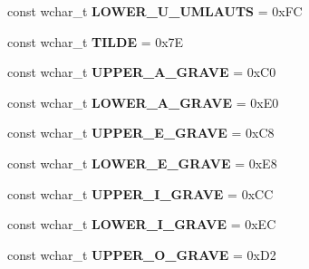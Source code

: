 \begin{DoxyCompactItemize}
\item 
\hypertarget{group___indexing_ga96b79561e32ed393418b5d21ce0f3fad}{const wchar\-\_\-t {\bfseries L\-O\-W\-E\-R\-\_\-\-U\-\_\-\-U\-M\-L\-A\-U\-T\-S} = 0x\-F\-C}\label{group___indexing_ga96b79561e32ed393418b5d21ce0f3fad}

\item 
\hypertarget{group___indexing_ga1602d4f3afaafb87cfc706ae0fc72bce}{const wchar\-\_\-t {\bfseries T\-I\-L\-D\-E} = 0x7\-E}\label{group___indexing_ga1602d4f3afaafb87cfc706ae0fc72bce}

\item 
\hypertarget{group___indexing_ga8c401d2c95f1613f3028c30c9c3dd920}{const wchar\-\_\-t {\bfseries U\-P\-P\-E\-R\-\_\-\-A\-\_\-\-G\-R\-A\-V\-E} = 0x\-C0}\label{group___indexing_ga8c401d2c95f1613f3028c30c9c3dd920}

\item 
\hypertarget{group___indexing_gad683b154d045922a0a5de25e7c837ec4}{const wchar\-\_\-t {\bfseries L\-O\-W\-E\-R\-\_\-\-A\-\_\-\-G\-R\-A\-V\-E} = 0x\-E0}\label{group___indexing_gad683b154d045922a0a5de25e7c837ec4}

\item 
\hypertarget{group___indexing_ga662a573a962fa386fa070e78055c5a67}{const wchar\-\_\-t {\bfseries U\-P\-P\-E\-R\-\_\-\-E\-\_\-\-G\-R\-A\-V\-E} = 0x\-C8}\label{group___indexing_ga662a573a962fa386fa070e78055c5a67}

\item 
\hypertarget{group___indexing_gad06e4b2ecd54bb7e694f66301c641c3c}{const wchar\-\_\-t {\bfseries L\-O\-W\-E\-R\-\_\-\-E\-\_\-\-G\-R\-A\-V\-E} = 0x\-E8}\label{group___indexing_gad06e4b2ecd54bb7e694f66301c641c3c}

\item 
\hypertarget{group___indexing_gabd5696c94be07f8ec253c01e4c5d7298}{const wchar\-\_\-t {\bfseries U\-P\-P\-E\-R\-\_\-\-I\-\_\-\-G\-R\-A\-V\-E} = 0x\-C\-C}\label{group___indexing_gabd5696c94be07f8ec253c01e4c5d7298}

\item 
\hypertarget{group___indexing_ga0825b012be345e06291b93ae5ad56f61}{const wchar\-\_\-t {\bfseries L\-O\-W\-E\-R\-\_\-\-I\-\_\-\-G\-R\-A\-V\-E} = 0x\-E\-C}\label{group___indexing_ga0825b012be345e06291b93ae5ad56f61}

\item 
\hypertarget{group___indexing_ga39e8650e073a63556b09e389c17175e9}{const wchar\-\_\-t {\bfseries U\-P\-P\-E\-R\-\_\-\-O\-\_\-\-G\-R\-A\-V\-E} = 0x\-D2}\label{group___indexing_ga39e8650e073a63556b09e389c17175e9}


\end{DoxyCompactItemize}
